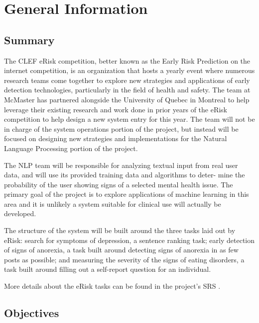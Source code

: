\documentclass[12pt, titlepage]{article}
\begin{document}
\newpage


\section{General Information}

\subsection{Summary}

The CLEF eRisk competition, better known as the Early Risk Prediction on
the internet competition, is an organization that hosts a yearly event where
numerous research teams come together to explore new strategies and applications of early detection technologies, particularly in the field of health
and safety. The team at McMaster has partnered alongside the University of
Quebec in Montreal to help leverage their existing research and work done
in prior years of the eRisk competition to help design a new system entry
for this year. The team will not be in charge of the system operations portion of the project, but instead will be focused on designing new strategies
and implementations for the Natural Language Processing portion of the
project.

The NLP team will be responsible for analyzing textual input from real
user data, and will use its provided training data and algorithms to deter-
mine the probability of the user showing signs of a selected mental health
issue. The primary goal of the project is to explore applications of machine learning in this area and it is unlikely a system suitable for clinical use will actually be developed.

The structure of the system will be built around the three tasks laid out by eRisk: search for symptoms of depression, a sentence ranking task; early detection of signs of anorexia, a task built around detecting signs of anorexia in as few posts as possible; and measuring the severity of the signs of eating disorders, a task built around filling out a self-report question for an individual.

More details about the eRisk tasks can be found in the project's SRS \citep{CogCareCrewSRS}.

\subsection{Objectives}
\end{document}
